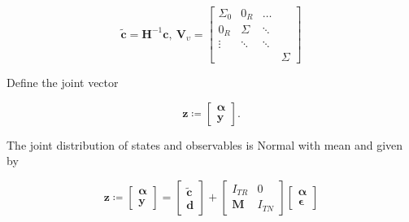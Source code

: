 \documentclass[notitlepage,a4paper,12pt]{article}
\begin{document}
$$
\tilde{\mathbf{c}}
=
\mathbf{H}^{-1} \mathbf{c}
, \:
\mathbf{V}_{\upsilon} = 
\begin{bmatrix}
    \Sigma_{0} & 0_R & \dots \\
    0_R & \Sigma & \ddots \\
    \vdots & \ddots & \ddots \\
    & & & \Sigma 
\end{bmatrix}
$$

Define the joint vector 

\begin{equation}
    \mathbf{z} \coloneqq 
    \begin{bmatrix}
        \boldsymbol{\alpha} \\
        \mathbf{y}
    \end{bmatrix}.
\end{equation}

The joint distribution of states and observables is Normal with mean and given by

\begin{equation}
    \mathbf{z} \coloneqq 
    \begin{bmatrix}
        \boldsymbol{\alpha} \\
        \mathbf{y}
    \end{bmatrix}
    = 
    \begin{bmatrix}
        \tilde{\mathbf{c}} \\
        \mathbf{d} 
    \end{bmatrix}
    +
    \begin{bmatrix}
        I_{TR} & 0 \\
        \mathbf{M} & I_{TN} 
    \end{bmatrix}
    \begin{bmatrix}
        \boldsymbol{\alpha}\\
        \mathbf{\epsilon}
    \end{bmatrix} 
\end{equation}

\end{document}
